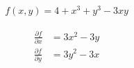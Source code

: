 \begin{align*}
    f(x, y) = 4 + x^3 + y^3 - 3xy
\end{align*}

\begin{solution}
\begin{align*}
    \frac{\partial f}{\partial x} &= 3x^2 - 3y \\
    \frac{\partial f}{\partial y} &= 3y^2 - 3x \\
\end{align*}
\end{solution}